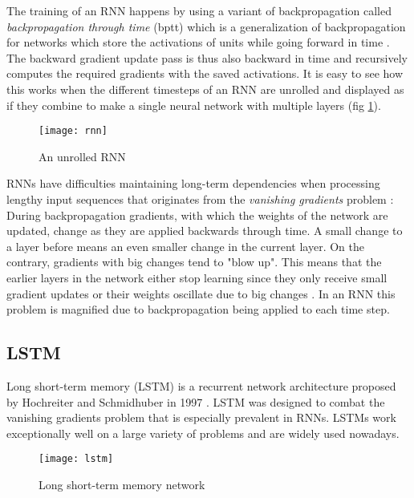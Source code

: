 The training of an RNN happens by using a variant of backpropagation called \textit{backpropagation through time} (bptt) which is a generalization of backpropagation for networks which store the activations of units while going forward in time \cite{rumelhart1985}.
The backward gradient update pass is thus also backward in time and recursively computes the required gradients with the saved activations.
It is easy to see how this works when the different timesteps of an RNN are unrolled and displayed as if they combine to make a single neural network with multiple layers (fig \ref{fig:rnn}).

\begin{figure}[t]
\texttt{[image: rnn]}
\centering
\caption{An unrolled RNN}
\label{fig:rnn}
\end{figure}

RNNs have difficulties maintaining long-term dependencies when processing lengthy input sequences that originates from the \textit{vanishing gradients} problem \cite{bengio1994}:
During backpropagation gradients, with which the weights of the network are updated, change as they are applied backwards through time.
A small change to a layer before means an even smaller change in the current layer.
On the contrary, gradients with big changes tend to "blow up".
This means that the earlier layers in the network either stop learning since they only receive small gradient updates or their weights oscillate due to big changes \cite{hochreiter1997}.
In an RNN this problem is magnified due to backpropagation being applied to each time step.

\subsection{LSTM} \label{LSTM}
Long short-term memory (LSTM) is a recurrent network architecture proposed by Hochreiter and Schmidhuber in 1997 \cite{hochreiter1997}.
LSTM was designed to combat the vanishing gradients problem that is especially prevalent in RNNs.
LSTMs work exceptionally well on a large variety of problems and are widely used nowadays.

\begin{figure}[t]
\texttt{[image: lstm]}
\centering
\caption{Long short-term memory network}
\label{fig:lstm}
\end{figure}

